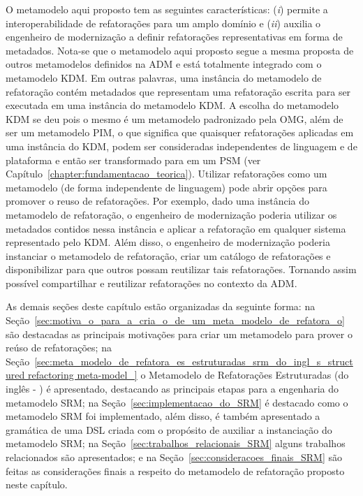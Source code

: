 O metamodelo aqui proposto tem as seguintes características: (\textit{i}) permite a interoperabilidade de refatorações para um amplo domínio e (\textit{ii}) auxilia o engenheiro de modernização a definir refatorações representativas em forma de metadados. Nota-se que o metamodelo aqui proposto segue a mesma proposta de outros metamodelos definidos na ADM e está totalmente integrado com o metamodelo KDM. Em outras palavras, uma instância do metamodelo de refatoração contém metadados que representam uma refatoração escrita para ser executada em uma instância do metamodelo KDM. A escolha do metamodelo KDM se deu pois o mesmo é um metamodelo padronizado pela OMG, além de ser um metamodelo PIM, o que significa que quaisquer refatorações aplicadas em uma instância do KDM, podem ser consideradas independentes de linguagem e de plataforma e então ser transformado para em um PSM (ver Capítulo~\ref{chapter:fundamentacao_teorica}). Utilizar refatorações como um metamodelo (de forma independente de linguagem) pode abrir opções para promover o reuso de refatorações. Por exemplo, dado uma instância do metamodelo de refatoração, o engenheiro de modernização poderia utilizar os metadados contidos nessa instância e aplicar a refatoração em qualquer sistema representado pelo KDM. Além disso, o engenheiro de modernização poderia instanciar o metamodelo de refatoração, criar um catálogo de refatorações e disponibilizar para que outros possam reutilizar tais refatorações. Tornando assim possível compartilhar e reutilizar refatorações no contexto da ADM.


As demais seções deste capítulo estão organizadas da seguinte forma: na Seção~\ref{sec:motiva_o_para_a_cria_o_de_um_meta_modelo_de_refatora_o} são destacadas as principais motivações para criar um metamodelo para prover o reúso de refatorações; na Seção~\ref{sec:meta_modelo_de_refatora_es_estruturadas_srm_do_ingl_s_structured refactoring meta-model_} o Metamodelo de Refatorações Estruturadas (do inglês - ) é apresentado, destacando as principais etapas para a engenharia do metamodelo SRM; na Seção~\ref{sec:implementacao_do_SRM}  é destacado como o metamodelo SRM foi implementado, além disso, é também apresentado a gramática de uma DSL criada com o propósito de auxiliar a instanciação do metamodelo SRM; na Seção~\ref{sec:trabalhos_relacionais_SRM} alguns trabalhos relacionados são apresentados; e na Seção~\ref{sec:consideracoes_finais_SRM} são feitas as considerações finais a respeito do metamodelo de refatoração proposto neste capítulo.

